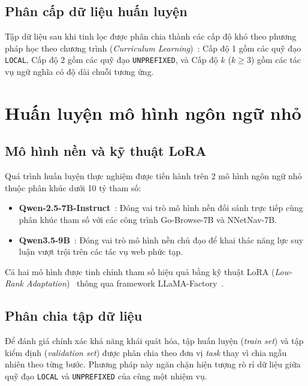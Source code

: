 \subsection{Phân cấp dữ liệu huấn luyện}

Tập dữ liệu sau khi tinh lọc được phân chia thành các cấp độ khó theo phương pháp học theo chương trình (\textit{Curriculum Learning})~\cite{bengio2009curriculum}: Cấp độ 1 gồm các quỹ đạo \texttt{LOCAL}, Cấp độ 2 gồm các quỹ đạo \texttt{UNPREFIXED}, và Cấp độ $k$ ($k \ge 3$) gồm các tác vụ ngữ nghĩa có độ dài chuỗi tương ứng.

\section{Huấn luyện mô hình ngôn ngữ nhỏ}
\label{sec:method-sft}

\subsection{Mô hình nền và kỹ thuật LoRA}

Quá trình huấn luyện thực nghiệm được tiến hành trên 2 mô hình ngôn ngữ nhỏ thuộc phân khúc dưới 10 tỷ tham số:
\begin{itemize}
  \item \textbf{Qwen-2.5-7B-Instruct}~\cite{qwen2024qwen25}: Đóng vai trò mô hình nền đối sánh trực tiếp cùng phân khúc tham số với các công trình Go-Browse-7B và NNetNav-7B.
  \item \textbf{Qwen3.5-9B}~\cite{qwen2026qwen35}: Đóng vai trò mô hình nền chủ đạo để khai thác năng lực suy luận vượt trội trên các tác vụ web phức tạp.
\end{itemize}

Cả hai mô hình được tinh chỉnh tham số hiệu quả bằng kỹ thuật LoRA (\textit{Low-Rank Adaptation})~\cite{hu2022lora} thông qua framework LLaMA-Factory~\cite{zheng2024llamafactory}.

\subsection{Phân chia tập dữ liệu}

Để đánh giá chính xác khả năng khái quát hóa, tập huấn luyện (\textit{train set}) và tập kiểm định (\textit{validation set}) được phân chia theo đơn vị \textit{task} thay vì chia ngẫu nhiên theo từng bước. Phương pháp này ngăn chặn hiện tượng rò rỉ dữ liệu giữa quỹ đạo \texttt{LOCAL} và \texttt{UNPREFIXED} của cùng một nhiệm vụ.

